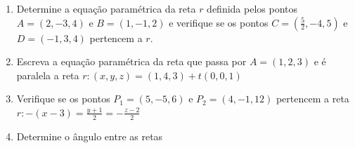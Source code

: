 \documentclass{article}
\begin{document}
\begin{enumerate}
\item Determine a equa\c{c}\~ao param\'etrica da reta $r$ definida pelos pontos $A = (2, -3, 4)$ e $B = (1, -1, 2)$ e verifique se os pontos $C = (\frac{5}{2}, -4, 5)$ e $D = (-1, 3, 4)$ pertencem a $r$.

\item Escreva a equa\c{c}\~ao param\'etrica da reta que passa por $A = (1, 2, 3)$ e \'e paralela a reta $r: (x, y, z) = (1, 4, 3) + t(0, 0, 1)$

\item Verifique se os pontos $P_1 = (5, -5, 6)$ e $P_2 = (4, -1, 12)$ pertencem a reta $\displaystyle r: -(x-3) = \frac{y+1}{2} = -\frac{z-2}{2}$



\item Determine o \^angulo entre as retas


\end{enumerate}
\end{document}
